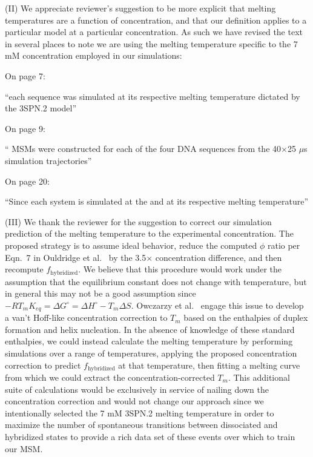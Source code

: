 \documentclass[11pt,a4paper]{letter} %
\newcommand*{\roodr}[1]{{\color{red}{#1}}}
\begin{document}
(II) We appreciate reviewer's suggestion to be more explicit that melting temperatures are a function of concentration, and that our definition applies to a particular model at a particular concentration. As such we have revised the text in several places to note we are using the melting temperature specific to the 7 mM concentration employed in our simulations:

On page 7:

``each sequence was simulated at its respective melting temperature \roodr{at 7mM concentration as} dictated by the 3SPN.2 model''

On page 9:

`` MSMs were constructed for each of the four DNA sequences \roodr{at their respective 3SPN.2 melting temperatures at 7 mM concentration} from the 40$\times$25 $\mu$s simulation trajectories''

On page 20:

``Since each system is simulated at the \roodr{same 7 mM concentration} and at its respective melting temperature''

(III) We thank the reviewer for the suggestion to correct our simulation prediction of the melting temperature to the experimental concentration. The proposed strategy is to assume ideal behavior, reduce the computed $\phi$ ratio per Eqn.~7 in Ouldridge et al.\ \cite{Ouldridge2010ExtractingSimulations} by the 3.5$\times$ concentration difference, and then recompute $f_\mathrm{hybridized}$. We believe that this procedure would work under the assumption that the equilibrium constant does not change with temperature, but in general this may not be a good assumption since $-R T_m K_{eq} = \Delta G^\circ = \Delta H^\circ - T_m \Delta S$. Owczarzy et al.\ \cite{Owczarzy1997predicting} engage this issue to develop a van't Hoff-like concentration correction to $T_m$ based on the enthalpies of duplex formation and helix nucleation. In the absence of knowledge of these standard enthalpies, we could instead calculate the melting temperature by performing simulations over a range of temperatures, applying the proposed concentration correction to predict $f_\mathrm{hybridized}$ at that temperature, then fitting a melting curve from which we could extract the concentration-corrected $T_m$. This additional suite of calculations would be exclusively in service of nailing down the concentration correction and would not change our approach since we intentionally selected the 7 mM 3SPN.2 melting temperature in order to maximize the number of spontaneous transitions between dissociated and hybridized states to provide a rich data set of these events over which to train our MSM. 
\end{document}
